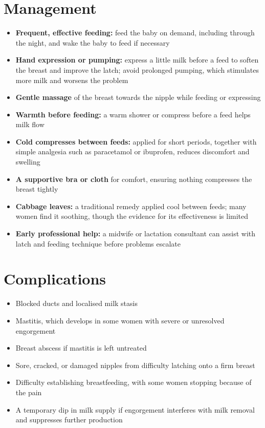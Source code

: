 \section*{Management}
\begin{itemize}
    \item \textbf{Frequent, effective feeding:} feed the baby on demand, including through the night, and wake the baby to feed if necessary
    \item \textbf{Hand expression or pumping:} express a little milk before a feed to soften the breast and improve the latch; avoid prolonged pumping, which stimulates more milk and worsens the problem
    \item \textbf{Gentle massage} of the breast towards the nipple while feeding or expressing
    \item \textbf{Warmth before feeding:} a warm shower or compress before a feed helps milk flow
    \item \textbf{Cold compresses between feeds:} applied for short periods, together with simple analgesia such as paracetamol or ibuprofen, reduces discomfort and swelling
    \item \textbf{A supportive bra or cloth} for comfort, ensuring nothing compresses the breast tightly
    \item \textbf{Cabbage leaves:} a traditional remedy applied cool between feeds; many women find it soothing, though the evidence for its effectiveness is limited
    \item \textbf{Early professional help:} a midwife or lactation consultant can assist with latch and feeding technique before problems escalate
\end{itemize}

\section*{Complications}
\begin{itemize}
    \item Blocked ducts and localised milk stasis
    \item Mastitis, which develops in some women with severe or unresolved engorgement
    \item Breast abscess if mastitis is left untreated
    \item Sore, cracked, or damaged nipples from difficulty latching onto a firm breast
    \item Difficulty establishing breastfeeding, with some women stopping because of the pain
    \item A temporary dip in milk supply if engorgement interferes with milk removal and suppresses further production
\end{itemize}

